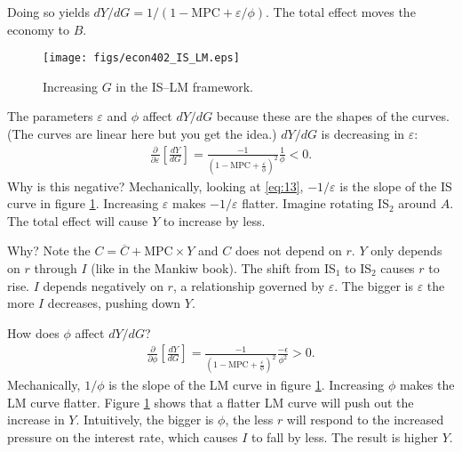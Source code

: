 \documentclass[12pt]{pracjourn_rwr}
\theoremstyle{definition}
\theoremstyle{remark}
\begin{document}
Doing so yields $d Y/ d G = 1 / ( 1 - \text{MPC} + \varepsilon / \phi)$.
The total effect moves the economy to $B$.

\begin{figure}[htbp]
\centerline{\texttt{[image: figs/econ402\_IS\_LM.eps]}}
\caption[]{\label{fig:is-lm} Increasing $G$ in the IS--LM framework.}
\end{figure}

The parameters $\varepsilon$ and $\phi$ affect $d Y/ d G$ because these are the shapes of the curves.
(The curves are linear here but you get the idea.)
$d Y / d G$ is decreasing in $\varepsilon$:
\begin{align*}
\frac{\partial}{\partial \varepsilon} \left[ \frac{d Y}{d G} \right] =
\frac{-1}{\left( 1 - \text{MPC} + \frac{\varepsilon}{\phi} \right)^{2}} \frac{1}{\phi} < 0.
\end{align*}
Why is this negative?
Mechanically, looking at \eqref{eq:13},
$-1 / \varepsilon$ is the slope of the IS curve in figure \ref{fig:is-lm}.
Increasing $\varepsilon$ makes $-1/\varepsilon$ flatter.
Imagine rotating IS$_{2}$ around $A$.
The total effect will cause $Y$ to increase by less.

Why?
Note the $C = \overline{C} + \text{MPC} \times Y$ and $C$ does not depend on $r$.
$Y$ only depends on $r$ through $I$ (like in the Mankiw book).
The shift from IS$_{1}$ to IS$_{2}$ causes $r$ to rise.
$I$ depends negatively on $r$, a relationship governed by $\varepsilon$.
The bigger is $\varepsilon$ the more $I$ decreases, pushing down $Y$.

How does $\phi$ affect $d Y / d G$?
\begin{align*}
\frac{\partial}{\partial \phi} \left[ \frac{d Y}{d G} \right] =
\frac{-1}{\left( 1 - \text{MPC} + \frac{\varepsilon}{\phi} \right)^{2}} \frac{-\epsilon}{\phi^{2}} > 0.
\end{align*}
Mechanically, $1 / \phi$ is the slope of the LM curve in figure \ref{fig:is-lm}.
Increasing $\phi$ makes the LM curve flatter.
Figure \ref{fig:is-lm} shows that a flatter LM curve will push out the increase in $Y$.
Intuitively,
the bigger is $\phi$, the less $r$ will respond to the increased pressure on the interest rate,
which causes $I$ to fall by less.
The result is higher $Y$.

% 
% 
\end{document}
